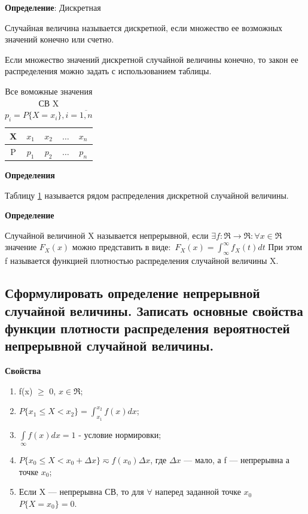 \textbf{Определение}: Дискретная

Случайная величина называется дискретной, если множество ее возможных значений конечно или счетно.

Если множество значений дискретной случайной величины конечно, то закон ее распределения можно задать с использованием таблицы.
\begin{table}[ht!]
	\begin{center}
		\caption{Все воможные значения СВ X $p_i = P\{X=x_i\}, i = \overline{1,n}$}
		\label{tbl:best}
		\begin{tabular}{|c|c|c|c|c|}
			\hline
			X & $x_1$ & $x_2$ & $\dots$ & $x_n$ \\ 
			\hline
			P & $p_1$ & $p_2$ & $\dots$ & $p_n$ \\
			\hline
		\end{tabular}
	\end{center}
\end{table}

\textbf{Определения}

Таблицу \ref{tbl:best} называется рядом распределения дискретной случайной величины.

\textbf{Определение}

Случайной величиной X называется непрерывной, если $\exists f: \Re \rightarrow \Re: \forall x \in \Re$ значение $F_X(x)$ можно представить в виде:\
$F_X(x) = \int_{\infty}^{\infty} f_X(t)dt$ При этом f называется функцией плотностью распределения случайной величины X.

\subsection{Сформулировать определение непрерывной случайной величины. Записать основные свойства функции плотности распределения вероятностей непрерывной случайной величины.}

\textbf{Свойства}

\begin{enumerate}[label=\arabic*.]
	\item f(x) $\geq$ 0, $x \in \Re$;
	\item $P\{x_1 \leq X < x_2\} = \int_{x_1}^{x_2}f(x)dx$;
	\item $\int\limits_{\infty}f(x)dx = 1$ - условие нормировки;
	\item $P\{x_0 \leq X < x_0 + \Delta x\} \eqsim f(x_0)\Delta x$, где $\Delta x$ --- мало, а f --- непрерывна а точке $x_0$;
	\item Если X --- непрерывна СВ, то для $\forall$ наперед заданной точке $x_0$ $P\{X=x_0\}=0$.
\end{enumerate}


